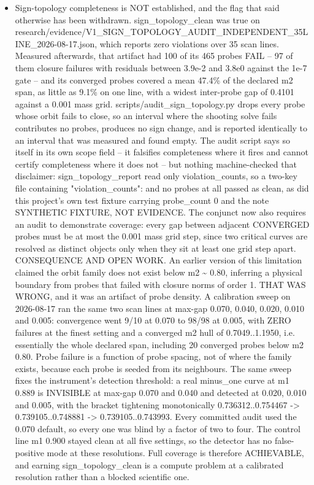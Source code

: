 \begin{itemize}
\item Sign-topology completeness is NOT established, and the flag that said otherwise has been withdrawn. sign\_topology\_clean was true on research/evidence/V1\_SIGN\_TOPOLOGY\_AUDIT\_INDEPENDENT\_35LINE\_2026-08-17.json, which reports zero violations over 35 scan lines. Measured afterwards, that artifact had 100 of its 465 probes FAIL -- 97 of them closure failures with residuals between 3.9e-2 and 3.8e0 against the 1e-7 gate -- and its converged probes covered a mean 47.4\% of the declared m2 span, as little as 9.1\% on one line, with a widest inter-probe gap of 0.4101 against a 0.001 mass grid. scripts/audit\_sign\_topology.py drops every probe whose orbit fails to close, so an interval where the shooting solve fails contributes no probes, produces no sign change, and is reported identically to an interval that was measured and found empty. The audit script says so itself in its own scope field -- it falsifies completeness where it fires and cannot certify completeness where it does not -- but nothing machine-checked that disclaimer: sign\_topology\_report read only violation\_counts, so a two-key file containing {"violation\_counts": {}} and no probes at all passed as clean, as did this project's own test fixture carrying probe\_count 0 and the note SYNTHETIC FIXTURE, NOT EVIDENCE. The conjunct now also requires an audit to demonstrate coverage: every gap between adjacent CONVERGED probes must be at most the 0.001 mass grid step, since two critical curves are resolved as distinct objects only when they sit at least one grid step apart. CONSEQUENCE AND OPEN WORK. An earlier version of this limitation claimed the orbit family does not exist below m2 \textasciitilde{} 0.80, inferring a physical boundary from probes that failed with closure norms of order 1. THAT WAS WRONG, and it was an artifact of probe density. A calibration sweep on 2026-08-17 ran the same two scan lines at max-gap 0.070, 0.040, 0.020, 0.010 and 0.005: convergence went 9/10 at 0.070 to 98/98 at 0.005, with ZERO failures at the finest setting and a converged m2 hull of 0.7049..1.1950, i.e. essentially the whole declared span, including 20 converged probes below m2 0.80. Probe failure is a function of probe spacing, not of where the family exists, because each probe is seeded from its neighbours. The same sweep fixes the instrument's detection threshold: a real minus\_one curve at m1 0.889 is INVISIBLE at max-gap 0.070 and 0.040 and detected at 0.020, 0.010 and 0.005, with the bracket tightening monotonically 0.736312..0.754467 -> 0.739105..0.748881 -> 0.739105..0.743993. Every committed audit used the 0.070 default, so every one was blind by a factor of two to four. The control line m1 0.900 stayed clean at all five settings, so the detector has no false-positive mode at these resolutions. Full coverage is therefore ACHIEVABLE, and earning sign\_topology\_clean is a compute problem at a calibrated resolution rather than a blocked scientific one.

\end{itemize}
